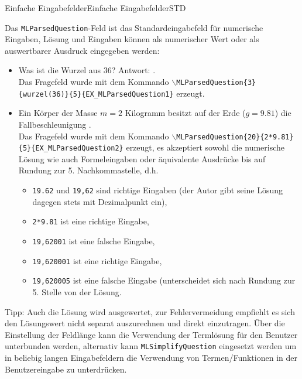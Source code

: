 \begin{MXContent}{Einfache Eingabefelder}{Einfache Eingabefelder}{STD}
\begin{MExample}
Das \texttt{MLParsedQuestion}-Feld ist das Standardeingabefeld für numerische Eingaben, Lösung und Eingaben können als numerischer Wert oder als auswertbarer Ausdruck eingegeben werden:
\begin{itemize}
\item{Was ist die Wurzel aus $36$? Antwort: .\\
Das Fragefeld wurde mit dem Kommando \texttt{$\backslash$MLParsedQuestion\{3\}\{wurzel(36)\}\{5\}\{EX\_MLParsedQuestion1\}} erzeugt.}
\item{Ein Körper der Masse $m=2$ Kilogramm besitzt auf der Erde ($g=9.81$) die Fallbeschleunigung .\\
Das Fragefeld wurde mit dem Kommando \texttt{$\backslash$MLParsedQuestion\{20\}\{2*9.81\}\{5\}\{EX\_MLParsedQuestion2\}} erzeugt, es akzeptiert sowohl die numerische
Lösung wie auch Formeleingaben oder äquivalente Ausdrücke bis auf Rundung zur 5. Nachkommastelle, d.h.
\ \\
\begin{itemize}
\item{\texttt{19.62} und \texttt{19,62} sind richtige Eingaben (der Autor gibt seine Lösung dagegen stets mit Dezimalpunkt ein),}
\item{\texttt{2*9.81} ist eine richtige Eingabe,}
\item{\texttt{19,62001} ist eine falsche Eingabe,}
\item{\texttt{19,620001} ist eine richtige Eingabe,}
\item{\texttt{19,620005} ist eine falsche Eingabe (unterscheidet sich nach Rundung zur 5. Stelle von der Lösung.}
\end{itemize}
}
\end{itemize}
Tipp: Auch die Lösung wird ausgewertet, zur Fehlervermeidung empfiehlt es sich den Lösungswert nicht separat auszurechnen und direkt einzutragen. Über die Einstellung
der Feldlänge kann die Verwendung der Termlösung für den Benutzer unterbunden werden, alternativ kann \texttt{MLSimplifyQuestion} eingesetzt werden
um in beliebig langen Eingabefeldern die Verwendung von Termen/Funktionen in der Benutzereingabe zu unterdrücken.
\end{MExample}


\end{MXContent}
